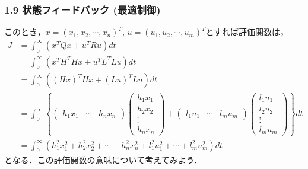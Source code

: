 \begin{frame}[t]
\frametitle{1.9 状態フィードバック (最適制御)}
このとき，$x = (x_1, x_2, \cdots, x_n)^T$, $u = (u_1, u_2, \cdots, u_m)^T$とすれば評価関数は，
{\footnotesize
\begin{align}
 J
 &= \int_{0}^{\infty} (x^T Q x + u^T R u) dt \nonumber \\
 &= \int_{0}^{\infty} (x^T H^TH x + u^T L^TL u) dt \nonumber \\
 &= \int_{0}^{\infty} ((Hx)^TH x + (Lu)^TL u) dt \nonumber \\
 &= \int_{0}^{\infty}
    \left\{
    \left(
    \begin{array}{cccc}
     h_1x_1 & \cdots & h_nx_n
    \end{array}
    \right)
    \left(
    \begin{array}{c}
     h_1x_1 \\
     h_2x_2 \\
     \vdots \\
     h_nx_n
    \end{array}
    \right) +
    \left(
    \begin{array}{cccc}
     l_1u_1 & \cdots & l_mu_m
    \end{array}
    \right)
    \left(
    \begin{array}{c}
     l_1u_1 \\
     l_2u_2 \\
     \vdots \\
     l_mu_m
    \end{array}
    \right)
    \right\}dt \nonumber \\
 &= \int_0^{\infty} (h_1^2 x_1^2 + h_2^2 x_2^2 + \cdots +
     h_n^2 x_n^2 + l_1^2 u_1^2 + \cdots + l_m^2 u_m^2)dt
\label{eqn:P-index2}
\end{align}
}
となる．この評価関数の意味について考えてみよう．
\end{frame}


